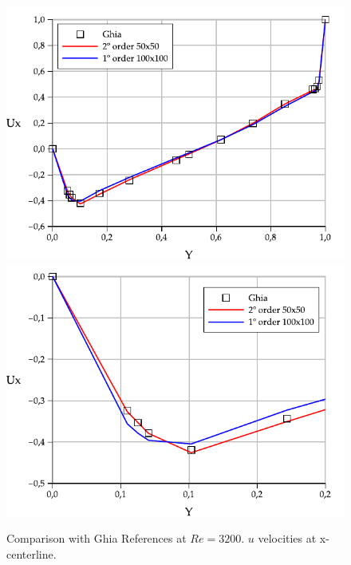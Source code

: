 \documentclass[a4paper,conference]{IEEEtran}
\begin{document}
\begin{figure}[htbp]
  \begin{center}
      \includegraphics[width=.85\linewidth]{images/Re_3200_Ux.pdf}
      \includegraphics[width=.85\linewidth]{images/Re_3200_Ux_zoom.pdf}
  \end{center}
  \caption{\label{fg:Re3200} Comparison with Ghia References at $Re=3200$. $u$ velocities at x-centerline.}
\end{figure}
\end{document}
